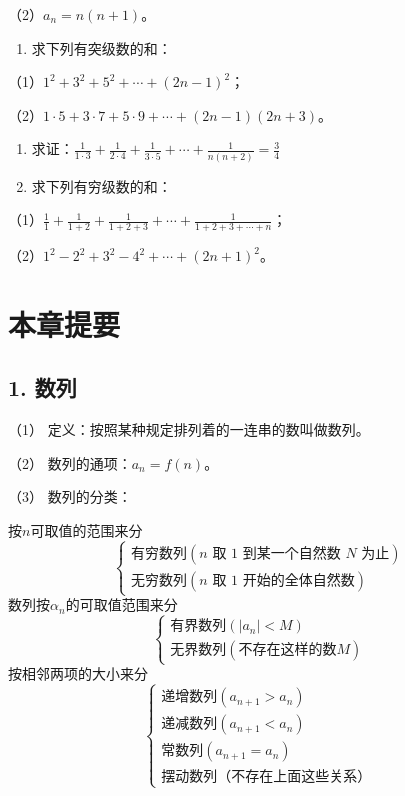 （2）\(a_{n} = n(n + 1)\)。

\begin{enumerate}[start=2]
\item
  求下列有突级数的和：
\end{enumerate}

（1）\(1^{2} + 3^{2} + 5^{2} + \cdots + (2n - 1)^{2}\)；

（2）\(1 \cdot 5 + 3 \cdot 7 + 5 \cdot 9 + \cdots + (2n - 1)(2n + 3)\)。

\begin{enumerate}[start=3]
\item
  求证：\(\frac{1}{1\cdot3}+\frac{1}{2\cdot4}+\frac{1}{3\cdot5}+\cdots+\frac{1}{n(n+2)}=\frac{3}{4}\)
\item
  求下列有穷级数的和：
\end{enumerate}

（1）\(\frac{1}{1} + \frac{1}{1 + 2} + \frac{1}{1 + 2 + 3} + \cdots + \frac{1}{1 + 2 + 3 + \cdots + n}\)；

（2）\(1^{2} - 2^{2} + 3^{2} - 4^{2} + \cdots + (2n + 1)^{2}\)。

\section{本章提要}

\subsection{1. 数列}

（1） 定义：按照某种规定排列着的一连串的数叫做数列。

（2） 数列的通项：\(a_{n}=f(n)\)。

（3） 数列的分类：

按\(n\)可取值的范围来分
\[
\left\{ \begin{array}{l} \text{有穷数列} (n \text{ 取 } 1 \text{ 到某一个自然数 } N \text{ 为止}) \\ \text{无穷数列} (n \text{ 取 } 1 \text{ 开始的全体自然数}) \end{array} \right.
\]
数列按\(\alpha_{n}\)的可取值范围来分
\[
\left\{\begin{array}{l} \text{有界数列} (|a_{n}| < M) \\ \text{无界数列} (\text{不存在这样的数} M) \end{array}\right.
\]
按相邻两项的大小来分
\[
\left\{\begin{array}{l}
\text{递增数列}(a_{n+1}>a_{n})\\
\text{递减数列}(a_{n+1}<a_{n})\\
\text{常数列}(a_{n+1}=a_{n})\\
\text{摆动数列（不存在上面这些关系）}
\end{array}\right.
\]

